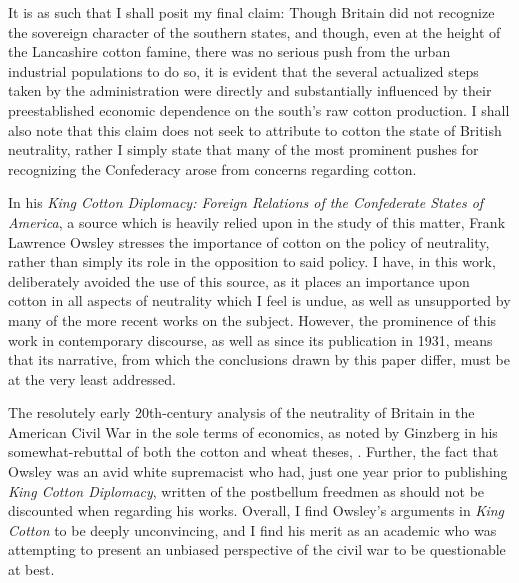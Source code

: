It is as such that I shall posit my final claim: Though Britain did not recognize the sovereign character of the southern states, and though, 
even at the height of the Lancashire cotton famine, there was no serious push from the urban industrial populations to do so, it is evident that the several actualized
steps taken by the administration were directly and substantially influenced by their preestablished economic dependence on the south's raw cotton production. I shall
also note that this claim does not seek to attribute to cotton the state of British neutrality, rather I simply state that many of the most prominent pushes for
recognizing the Confederacy arose from concerns regarding cotton.

\hfill

In his \textit{King Cotton Diplomacy: Foreign Relations of the Confederate States of America}, a source which is heavily relied upon in the study of this matter,
Frank Lawrence Owsley stresses the importance of cotton on the policy of neutrality, rather than simply its role in the opposition to said policy. I have, in this work,
deliberately avoided the use of this source, as it places an importance upon cotton in all aspects of neutrality which I feel is undue, as well as unsupported by
many of the more recent works on the subject. However, the prominence of this work in contemporary discourse, as well as since its publication in 1931, means that
its narrative, from which the conclusions drawn by this paper differ, must be at the very least addressed.

The resolutely early 20th-century analysis of the neutrality of Britain in the American Civil War in the sole terms of economics, as noted by Ginzberg in his
somewhat-rebuttal of both the cotton and wheat theses,  \autocite{ginzbergeconomicsbritish1936}. Further, the fact that Owsley was an avid white supremacist who had, just one year prior to publishing
\textit{King Cotton Diplomacy}, written of the postbellum freedmen as \Autocite[62]{owsleyIrrepressibleConflict1930} should not be discounted
when regarding his works. Overall, I find Owsley's arguments in \textit{King Cotton} to be deeply unconvincing, and I find his merit as an academic who was attempting to
present an unbiased perspective of the civil war to be questionable at best.